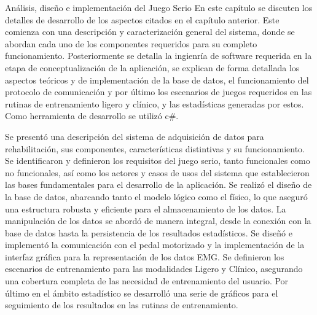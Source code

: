 \begin{thesischapter}{2} {Análisis, diseño e implementación del Juego Serio}
En este capítulo se discuten los detalles de desarrollo de los aspectos citados en el capítulo anterior. Este comienza con una descripción y caracterización general del sistema, donde se  abordan cada uno de los componentes requeridos para su completo funcionamiento. Posteriormente se detalla la ingienría de software requerida en la etapa de conceptualización de la aplicación, se explican de forma detallada los aspectos teóricos y de implementación de la base de datos, el funcionamiento del protocolo de comunicación y por último los escenarios de juegos requeridos en las rutinas de entrenamiento ligero y clínico, y las estadísticas generadas por estos. Como herramienta de desarrollo se utilizó c\#.


     
    

















Se presentó una descripción del sistema de adquisición de datos para rehabilitación, sus componentes, características distintivas y su funcionamiento. Se identificaron y definieron los requisitos del juego  serio, tanto funcionales como no funcionales, así como los actores y casos de usos del sistema que establecieron las bases fundamentales para el desarrollo de la aplicación. Se realizó el diseño de la base de datos, abarcando tanto el modelo lógico como el físico, lo que aseguró una estructura robusta y eficiente para el almacenamiento de los datos. La manipulación de los datos se abordó de manera integral, desde la conexión con la base de datos hasta la persistencia de los resultados estadísticos. Se diseñó e implementó la comunicación con el pedal motorizado y la implementación de la interfaz gráfica para la representación de los datos EMG. Se definieron los escenarios de entrenamiento para las modalidades Ligero y Clínico, asegurando una cobertura completa de las necesidad de entrenamiento del usuario. Por último en el ámbito estadístico se desarrolló una serie de gráficos para el seguimiento de los resultados en las rutinas de entrenamiento.   
    
\end{thesischapter}